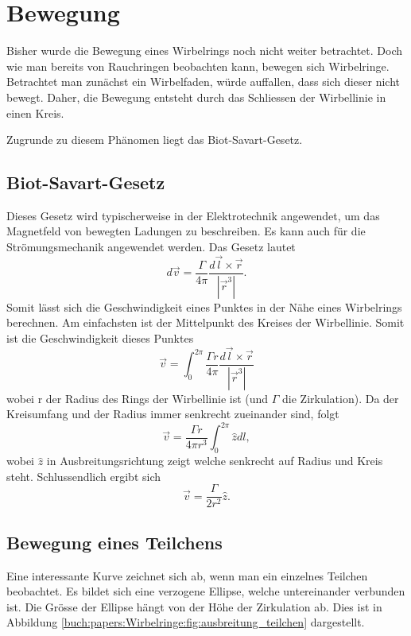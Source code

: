 %
%
%
\section{Bewegung}

Bisher wurde die Bewegung eines Wirbelrings noch nicht weiter betrachtet. 
Doch wie man bereits von Rauchringen beobachten kann, bewegen sich Wirbelringe. 
Betrachtet man zunächst ein Wirbelfaden, würde auffallen, dass sich dieser nicht bewegt. 
Daher, die Bewegung entsteht durch das Schliessen der Wirbellinie in einen Kreis. 

Zugrunde zu diesem Phänomen liegt das Biot-Savart-Gesetz\cite{Wirbelringe:FuehrerdurchdieStroemungslehre}. 

\subsection{Biot-Savart-Gesetz}

Dieses Gesetz wird typischerweise in der Elektrotechnik angewendet, um das Magnetfeld von bewegten Ladungen zu beschreiben. 
Es kann auch für die Strömungsmechanik angewendet werden. 
Das Gesetz lautet 
\[
d \vec{v}
=
\frac{\Gamma}{4\pi}\frac{d \vec{l} \times \vec{r}}{\left\lvert \vec{r}^3\right\rvert }.
\]
Somit lässt sich die Geschwindigkeit eines Punktes in der Nähe eines Wirbelrings berechnen. 
Am einfachsten ist der Mittelpunkt des Kreises der Wirbellinie. 
Somit ist die Geschwindigkeit dieses Punktes
\[
\vec{v}
=
\int_{0}^{2\pi} \frac{\Gamma r}{4\pi}\frac{d \vec{l} \times \vec{r}}{\left\lvert \vec{r}^3\right\rvert }
\]
wobei r der Radius des Rings der Wirbellinie ist (und \(\Gamma\) die Zirkulation). 
Da der Kreisumfang und der Radius immer senkrecht zueinander sind, folgt 
\[
\vec{v}
=
\frac{\Gamma r}{4\pi r^3} \int_{0}^{2\pi} \hat{z} dl,
\]
wobei \(\hat{z}\) in Ausbreitungsrichtung zeigt welche senkrecht auf Radius und Kreis steht. 
Schlussendlich ergibt sich
\[
\vec{v}
=
\frac{\Gamma }{2 r^2}\hat{z}.
\]

\subsection{Bewegung eines Teilchens}



Eine interessante Kurve zeichnet sich ab, wenn man ein einzelnes Teilchen beobachtet. 
Es bildet sich eine verzogene Ellipse, welche untereinander verbunden ist. 
Die Grösse der Ellipse hängt von der Höhe der Zirkulation ab. 
Dies ist in Abbildung \ref{buch:papers:Wirbelringe:fig:ausbreitung_teilchen} dargestellt.
